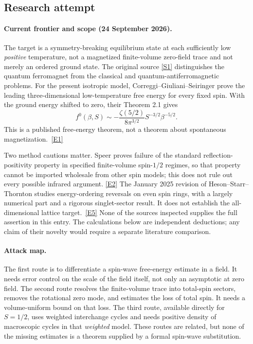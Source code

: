 \documentclass[11pt]{article}
\newcommand{\sref}[2]{\hyperlink{source:#1:#2}{[S#2]}}
\newcommand{\eref}[2]{\hyperlink{extra:#1:#2}{[E#2]}}
\begin{document}
	\subsection{Research attempt}
	
	\paragraph{Current frontier and scope (24 September 2026).}
	The target is a symmetry-breaking equilibrium state at each sufficiently
	low \emph{positive} temperature, not a magnetized finite-volume zero-field
	trace and not merely an ordered ground state. The original source
	\sref{30006979}{1} distinguishes the quantum ferromagnet from the classical
	and quantum-antiferromagnetic problems. For the present isotropic model,
	Correggi--Giuliani--Seiringer prove the leading three-dimensional
	low-temperature free energy for every fixed spin. With the ground
	energy shifted to zero, their Theorem 2.1 gives
	\[
	f^0(\beta,S)\sim
	-\frac{\zeta(5/2)}{8\pi^{3/2}}S^{-3/2}\beta^{-5/2}.
	\]
	This is a published free-energy theorem, not a theorem about spontaneous
	magnetization.\ \eref{30006979}{1}
	
	Two method cautions matter. Speer proves failure of the standard
	reflection-positivity property in specified finite-volume spin-$1/2$
	regimes, so that property cannot be imported wholesale from other spin
	models; this does not rule out every possible infrared argument.
	\eref{30006979}{2} The January 2025 revision of Heson--Starr--Thornton studies
	energy-ordering reversals on even spin rings, with a largely numerical
	part and a rigorous singlet-sector result. It does not establish the
	all-dimensional lattice target.\ \eref{30006979}{5}
	None of the sources inspected supplies the full assertion in this entry.
	The calculations below are independent deductions; any claim of their
	novelty would require a separate literature comparison.
	
	\paragraph{Attack map.}
	The first route is to differentiate a spin-wave free-energy estimate in
	a field. It needs error control on the scale of the field itself, not
	only an asymptotic at zero field. The second route resolves the
	finite-volume trace into total-spin sectors, removes the rotational
	zero mode, and estimates the loss of total spin. It needs a
	volume-uniform bound on that loss. The third route, available directly
	for $S=1/2$, uses weighted interchange cycles and needs positive density
	of macroscopic cycles in that \emph{weighted} model. These routes are
	related, but none of the missing estimates is a theorem supplied by a
	formal spin-wave substitution.
	
\end{document}
